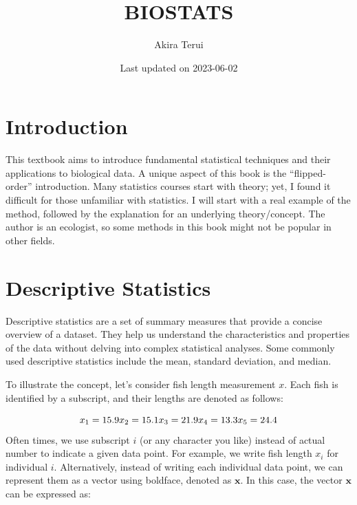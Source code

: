 \documentclass[
]{book}
\title{BIOSTATS}
\author{Akira Terui}
\date{Last updated on 2023-06-02}
\begin{document}
\maketitle

{
\setcounter{tocdepth}{1}
\tableofcontents
}
\hypertarget{introduction}{%
\chapter*{Introduction}\label{introduction}}

This textbook aims to introduce fundamental statistical techniques and their applications to biological data. A unique aspect of this book is the ``flipped-order'' introduction. Many statistics courses start with theory; yet, I found it difficult for those unfamiliar with statistics. I will start with a real example of the method, followed by the explanation for an underlying theory/concept. The author is an ecologist, so some methods in this book might not be popular in other fields.

\hypertarget{descriptive-statistics}{%
\chapter{Descriptive Statistics}\label{descriptive-statistics}}

Descriptive statistics are a set of summary measures that provide a concise overview of a dataset. They help us understand the characteristics and properties of the data without delving into complex statistical analyses. Some commonly used descriptive statistics include the mean, standard deviation, and median.

To illustrate the concept, let's consider fish length measurement \(x\). Each fish is identified by a subscript, and their lengths are denoted as follows:

\[
x_1 = 15.9\\
x_2 = 15.1\\
x_3 = 21.9\\
x_4 = 13.3\\
x_5 = 24.4\\
\]Often times, we use subscript \(i\) (or any character you like) instead of actual number to indicate a given data point. For example, we write fish length \(x_i\) for individual \(i\). Alternatively, instead of writing each individual data point, we can represent them as a vector using boldface, denoted as \(\pmb{x}\). In this case, the vector \(\pmb{x}\) can be expressed as:
\end{document}
